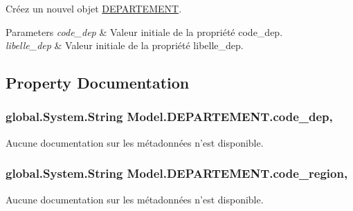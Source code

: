 Créez un nouvel objet \hyperlink{class_model_1_1_d_e_p_a_r_t_e_m_e_n_t}{D\-E\-P\-A\-R\-T\-E\-M\-E\-N\-T}. 


\begin{DoxyParams}{Parameters}
{\em code\-\_\-dep} & Valeur initiale de la propriété code\-\_\-dep.\\
\hline
{\em libelle\-\_\-dep} & Valeur initiale de la propriété libelle\-\_\-dep.\\
\hline
\end{DoxyParams}


\subsection{Property Documentation}
\hypertarget{class_model_1_1_d_e_p_a_r_t_e_m_e_n_t_a2f34735310ea76c3f5b6cf158b85c314}{
\subsubsection[{code\-\_\-dep}]{\setlength{\rightskip}{0pt plus 5cm}global.\-System.\-String Model.\-D\-E\-P\-A\-R\-T\-E\-M\-E\-N\-T.\-code\-\_\-dep\hspace{0.3cm}{\ttfamily [get]}, {\ttfamily [set]}}}\label{class_model_1_1_d_e_p_a_r_t_e_m_e_n_t_a2f34735310ea76c3f5b6cf158b85c314}


Aucune documentation sur les métadonnées n'est disponible. 

\hypertarget{class_model_1_1_d_e_p_a_r_t_e_m_e_n_t_ab0e3826fb790a948c808c7ecabd4e2f9}{
\subsubsection[{code\-\_\-region}]{\setlength{\rightskip}{0pt plus 5cm}global.\-System.\-String Model.\-D\-E\-P\-A\-R\-T\-E\-M\-E\-N\-T.\-code\-\_\-region\hspace{0.3cm}{\ttfamily [get]}, {\ttfamily [set]}}}\label{class_model_1_1_d_e_p_a_r_t_e_m_e_n_t_ab0e3826fb790a948c808c7ecabd4e2f9}


Aucune documentation sur les métadonnées n'est disponible. 

